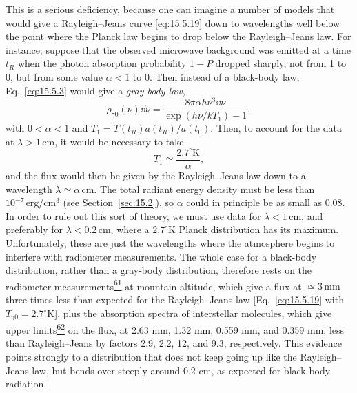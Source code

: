 This is a serious deficiency, because one can imagine a number of models that
would give a Rayleigh--Jeans curve \eqref{eq:15.5.19} down to wavelengths
well below the point where the Planck law begins to drop below the
Rayleigh--Jeans law. For instance, suppose that the observed microwave
background was emitted at a time \(t_R\) when the photon absorption probability
\(1-P\) dropped sharply, not from 1 to 0, but from some value
\(\alpha<1\) to 0. Then instead of a black-body law,
Eq.~\eqref{eq:15.5.3} would give a \emph{gray-body law},
\begin{equation}
  \rho_{\gamma0}(\nu)\dd\nu
  =
  \frac{8\pi\alpha h\nu^3\dd\nu}
  {\exp(h\nu/kT_1)-1},
  \tag{15.5.20}\label{eq:15.5.20}
\end{equation}
with \(0<\alpha<1\) and \(T_1=T(t_R)a(t_R)/a(t_0)\). Then, to account for
the data at \(\lambda>1\,\mathrm{cm}\), it would be necessary to take
\[
  T_1\simeq\frac{2.7^\circ\mathrm{K}}{\alpha},
\]
and the flux would then be given by the Rayleigh--Jeans law down to a
wavelength \(\lambda\simeq\alpha\,\mathrm{cm}\). The total radiant energy
density must be less than \(10^{-7}\,\mathrm{erg/cm^3}\) (see
Section~\ref{sec:15.2}), so \(\alpha\) could in principle be as small as
0.08. In order to rule out this sort of theory, we must use data for
\(\lambda<1\,\mathrm{cm}\), and preferably for \(\lambda<0.2\,\mathrm{cm}\),
where a \(2.7^\circ\mathrm{K}\) Planck distribution has its maximum.
Unfortunately, these are just the wavelengths where the atmosphere begins to
interfere with radiometer measurements. The whole case for a black-body
distribution, rather than a gray-body distribution, therefore rests on the
radiometer measurements\hyperref[ch15-ref-61]{\textsuperscript{61}} at
mountain altitude, which give a flux at \(\simeq3\,\mathrm{mm}\) three times
less than expected for the Rayleigh--Jeans law
[Eq.~\eqref{eq:15.5.19} with \(T_{\gamma0}=2.7^\circ\mathrm{K}\)], plus the
absorption spectra of interstellar molecules, which give upper
limits\hyperref[ch15-ref-62]{\textsuperscript{62}} on the flux, at 2.63 mm,
1.32 mm, 0.559 mm, and 0.359 mm, less than Rayleigh--Jeans by factors 2.9,
2.2, 12, and 9.3, respectively. This evidence points strongly to a
distribution that does not keep going up like the Rayleigh--Jeans law, but
bends over steeply around 0.2 cm, as expected for black-body radiation.

